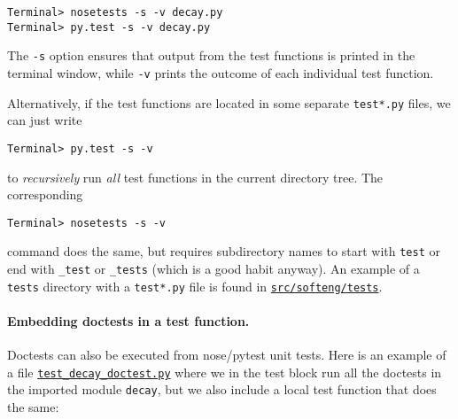 \documentclass[graybox,sectrefs,envcountresetchap,open=right,final]{svmonodo}
\begin{document}
\begin{Verbatim}[frame=lines,label=\fbox{{\tiny Terminal}},framesep=2.5mm,framerule=0.7pt,fontsize=\fontsize{9pt}{9pt}]
Terminal> nosetests -s -v decay.py
Terminal> py.test -s -v decay.py
\end{Verbatim}
The \texttt{-s} option ensures that output from the test functions is printed
in the terminal window, while \texttt{-v} prints the outcome of each individual
test function.

Alternatively, if the test functions are located in some separate
\texttt{test*.py} files,
we can just write

\begin{Verbatim}[frame=lines,label=\fbox{{\tiny Terminal}},framesep=2.5mm,framerule=0.7pt,fontsize=\fontsize{9pt}{9pt}]
Terminal> py.test -s -v
\end{Verbatim}
to \emph{recursively} run \emph{all} test functions in the current
directory tree. The corresponding

\begin{Verbatim}[frame=lines,label=\fbox{{\tiny Terminal}},framesep=2.5mm,framerule=0.7pt,fontsize=\fontsize{9pt}{9pt}]
Terminal> nosetests -s -v
\end{Verbatim}
command does the same, but requires subdirectory names to start
with \texttt{test} or end with \Verb!_test! or \Verb!_tests! (which is a good habit anyway).
An example of a \texttt{tests} directory with a \texttt{test*.py}
file is found in \href{{http://tinyurl.com/ofkw6kc/softeng/tests}}{\nolinkurl{src/softeng/tests}}.


\paragraph{Embedding doctests in a test function.}
Doctests can also be executed from nose/pytest unit tests. Here is an
example of a file \href{{http://tinyurl.com/ofkw6kc/softeng/tests/test_decay_doctest.py}}{\nolinkurl{test_decay_doctest.py}} where we in the test
block run all the doctests in the imported module \texttt{decay}, but we also
include a local test function that does the same:
\end{document}
